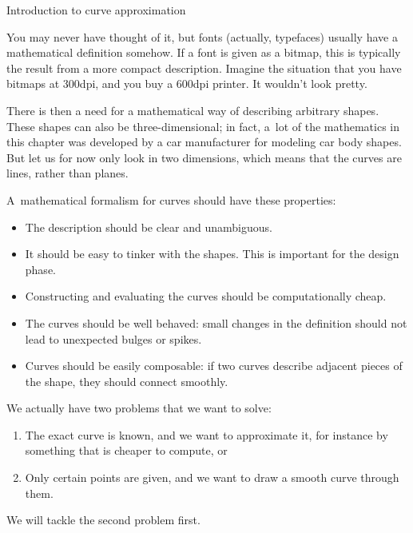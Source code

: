 \renewcommand\textfraction{.15}
\renewcommand\bottomfraction{.6}
\renewcommand\topfraction{.6}
\newcommand\gnuplotsource[2]{
\begin{figure}[b]
\footnotesize
\begin{multicols}{2}

\end{multicols}
\caption{#2}
\end{figure}
}

 {Introduction to curve approximation}

You may never have thought of it, but fonts (actually, typefaces)
usually have a mathematical definition somehow. If a font is given as
a bitmap, this is typically the result from a more compact
description. Imagine the situation that you have bitmaps at 300dpi,
and you buy a 600dpi printer. It wouldn't look pretty.

There is then a need for a mathematical way of describing arbitrary
shapes. These shapes can also be three-dimensional; in fact, a~lot of
the mathematics in this chapter was developed by a car manufacturer
for modeling car body shapes.
But let us for now only look in two dimensions, which means that the
curves are lines, rather than planes.

A~mathematical formalism for curves should have these properties:
\begin{itemize}
\item The description should be clear and unambiguous.
\item It should be easy to tinker with the shapes. This is important
  for the design phase.
\item Constructing and evaluating the curves should be computationally
  cheap.
\item The curves should be well behaved: small changes in the
  definition should not lead to unexpected bulges or spikes.
\item Curves should be easily composable: if two curves describe
  adjacent pieces of the shape, they should connect smoothly.
\end{itemize}

We actually have two problems that we want to solve:
\begin{enumerate}
\item The exact curve is known, and we want to approximate it, for
  instance by something that is cheaper to compute, or
\item Only certain points are given, and we want to draw a smooth
  curve through them.
\end{enumerate}
We will tackle the second problem first.

